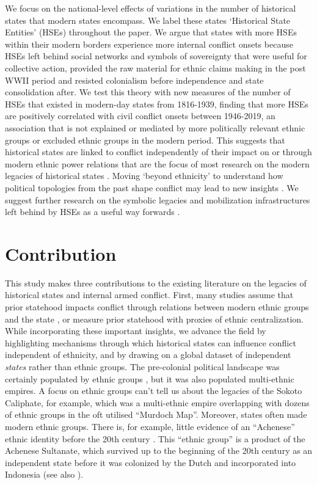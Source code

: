 We focus on the national-level effects of variations in the number of historical
states that modern states encompass. We label these states `Historical State
Entities' (HSEs) throughout the paper. We argue that states with more HSEs
within their modern borders experience more internal conflict onsets because
HSEs left behind social networks and symbols of sovereignty that were useful for
collective action, provided the raw material for ethnic claims making in the
post WWII period and resisted colonialism before independence and state
consolidation after. We test this theory with new measures of the number of HSEs
that existed in modern-day states from 1816-1939, finding that more HSEs
are positively correlated with civil conflict onsets between
1946-2019, an association that is not explained or mediated by more politically
relevant ethnic groups or excluded ethnic groups in the modern period. This
suggests that historical states are linked to conflict independently of their
impact on or through modern ethnic power relations that are the focus of most
research on the modern legacies of historical states \citep{Paine2019, Wig2016}.
Moving `beyond ethnicity' to understand how political topologies from the past
shape conflict may lead to new insights \citep{Herbst2014, Blaydes2013, Mazzuca2021}. We
suggest further research on the symbolic legacies and mobilization
infrastructures left behind by HSEs as a useful way forwards \citep{Ahram2019}. 

\section{Contribution}

This study makes three contributions to the existing literature on the legacies
of historical states and internal armed conflict. First, many studies assume
that prior statehood impacts conflict through relations between modern ethnic
groups and the state \citep{Englebert2002, Paine2019, Wig2016}, or measure prior
statehood with proxies of ethnic centralization. While incorporating these
important insights, we advance the field by highlighting mechanisms through
which historical states can influence conflict independent of ethnicity, and by
drawing on a global dataset of independent \textit{states} rather than ethnic
groups. The pre-colonial political landscape was certainly populated by ethnic
groups \citep{Murdock1967}, but it was also populated multi-ethnic empires. A
focus on ethnic groups can’t tell us about the legacies of the Sokoto Caliphate,
for example, which was a multi-ethnic empire overlapping with dozens of ethnic
groups in the oft utilised ``Murdoch Map''. Moreover, states often made modern
ethnic groups. There is, for example, little evidence of an ``Achenese'' ethnic
identity before the 20th century \citep{Aspinall2009}. This ``ethnic group'' is
a product of the Achenese Sultanate, which survived up to the beginning of the
20th century as an independent state before it was colonized by the Dutch and
incorporated into Indonesia (see also \citep{Wimmer2018}). 

